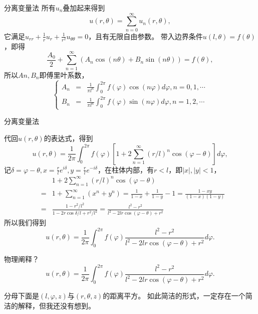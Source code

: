 \documentclass[11pt]{beamer}
\newcommand{\kong}[1][0.5]{\vspace{#1cm}}
\begin{document}
\begin{frame}{分离变量法}
所有$u_n$叠加起来得到
\begin{equation}
u(r,\theta) = \sum^\infty_{n=0} u_n(r,\theta),
\end{equation}
它满足$u_{rr} + \frac{1}{r}u_r + \frac{1}{r^2}u_{\theta\theta} = 0$，且有无限自由参数。
带入边界条件$u(l,\theta) = f(\theta)$，即得
\begin{equation}
\frac{A_0}{2} + \sum^\infty_{n=1}(A_n\cos(n\theta) + B_n\sin(n\theta) ) = f(\theta),
\end{equation}
所以$An,B_n$即傅里叶系数，
\begin{equation}
\left\{
\begin{aligned}
A_n &=& \frac{1}{\pi l^n} \int^{2\pi}_0 f(\varphi) \cos(n\varphi) d\varphi, n=0,1,\cdots \\
B_n &=& \frac{1}{\pi l^n} \int^{2\pi}_0 f(\varphi) \sin(n\varphi) d\varphi, n=1,2,\cdots
\end{aligned}
\right.
\end{equation}
\end{frame}

\begin{frame}{分离变量法}

代回$u(r,\theta)$的表达式，得到
\begin{equation}
u(r,\theta) = \frac{1}{2\pi} \int^{2\pi}_0 f(\varphi) [ 1+ 2\sum^\infty_{n=1} (r/l)^n \cos(\varphi-\theta) ] d\varphi,
\end{equation}
记$\delta = \varphi - \theta, x = \frac{r}{l} e^{i\delta}, y= \frac{r}{l} e^{-i\delta}$，在柱体内部，有$r<l$，即$|x|, |y|<1$，
\begin{eqnarray}
&& 1+ 2\sum^\infty_{n=1} (r/l)^n \cos(\varphi-\theta) \nonumber\\
&=& 1 + \sum^\infty_{n=1}(x^n + y^n) 
= \frac{1}{1-x} + \frac{1}{1-y} -1 = \frac{1-xy}{(1-x)(1-y)} \nonumber\\
&=& \frac{1-r^2/l^2}{1-2r\cos\delta/l + r^2/l^2}
= \frac{l^2 - r^2 }{l^2 - 2lr\cos(\varphi - \theta) + r^2}
\end{eqnarray}
所以我们得到
\begin{equation}
u(r,\theta) = \frac{1}{2\pi}\int^{2\pi}_0 f(\varphi) \frac{l^2 - r^2 }{l^2 - 2lr\cos(\varphi - \theta) + r^2} d \varphi.
\end{equation}
\end{frame}

\begin{frame}{物理阐释？}
\begin{equation}
u(r,\theta) = \frac{1}{2\pi}\int^{2\pi}_0 f(\varphi) \frac{l^2 - r^2 }{l^2 - 2lr\cos(\varphi - \theta) + r^2} d \varphi.
\end{equation}

\kong[1]
分母下面是$(l,\varphi,z)$与$(r,\theta,z)$的距离平方。
如此简洁的形式，一定存在一个简洁的解释，但我还没有想到。
\end{frame}
\end{document}
